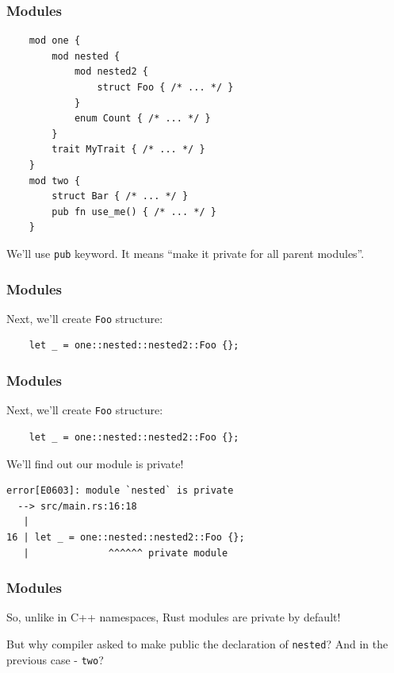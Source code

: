 \documentclass[aspectratio=1610,t]{beamer}
\begin{document}

\begin{frame}[fragile]
\frametitle{Modules}
\begin{verbatim}
    mod one {
        mod nested {
            mod nested2 {
                struct Foo { /* ... */ }
            }
            enum Count { /* ... */ }
        }
        trait MyTrait { /* ... */ }
    }
    mod two {
        struct Bar { /* ... */ }
        pub fn use_me() { /* ... */ }
    }
\end{verbatim}

We'll use \texttt{pub} keyword. It means ``make it private for all parent modules''.
\end{frame}


\begin{frame}[fragile]
\frametitle{Modules}
Next, we'll create \texttt{Foo} structure:

\begin{verbatim}
    let _ = one::nested::nested2::Foo {};
\end{verbatim}
\end{frame}


\begin{frame}[fragile]
\frametitle{Modules}
Next, we'll create \texttt{Foo} structure:

\begin{verbatim}
    let _ = one::nested::nested2::Foo {};
\end{verbatim}

We'll find out our module is private!

\begin{verbatim}
error[E0603]: module `nested` is private
  --> src/main.rs:16:18
   |
16 | let _ = one::nested::nested2::Foo {};
   |              ^^^^^^ private module
\end{verbatim}
\end{frame}


\begin{frame}[fragile]
\frametitle{Modules}
So, unlike in C++ namespaces, Rust modules are private by default!

But why compiler asked to make public the declaration of \texttt{nested}? And in the previous case - \texttt{two}?


\end{frame}
\end{document}
